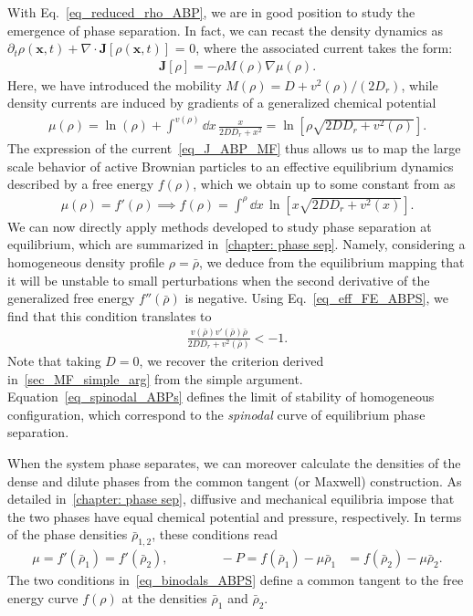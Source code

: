 With Eq.~\eqref{eq_reduced_rho_ABP}, we are in good position to study the emergence of phase separation.
In fact, we can recast the density dynamics as $\partial_t \rho(\bm x, t)  + \nabla \cdot \bm J[\rho(\bm x, t)]$ = 0,
where the associated current takes the form:
% 
\begin{align}\label{eq_J_ABP_MF}
   \bm J[\rho] = - \rho M(\rho) \nabla \mu(\rho).
\end{align}
%
Here, we have introduced the mobility $M(\rho) = D + v^2(\rho)/ (2D_r)$,
while density currents are induced by gradients of a generalized chemical potential 
\begin{align*}
    \mu(\rho) = \ln(\rho)
    + \int^{v(\rho)} \dd x \, \frac{x}{2 D D_r + x^2} = \ln\left[\rho \sqrt{2 D D_r + v^2(\rho)}\right].
\end{align*}
The expression of the current~\eqref{eq_J_ABP_MF} thus allows us to map the large scale behavior of active Brownian particles to an effective equilibrium dynamics described by a free energy $f(\rho)$, which we obtain up to some constant from as
%
\begin{align} \label{eq_eff_FE_ABPS}
    \mu(\rho) = f'(\rho) \implies
    f(\rho) = \int^\rho \dd x \, \ln \left[ x \sqrt{2 D D_r + v^2(x)}\right].
\end{align}
%
We can now directly apply methods developed to study phase separation at equilibrium, which are summarized in~\autoref{chapter: phase sep}.
Namely, considering a homogeneous density profile $\rho = \bar\rho$, 
we deduce from the equilibrium mapping 
that it will be unstable to small perturbations when the second derivative of the generalized free energy $f''(\bar{\rho})$ is negative.
Using Eq.~\eqref{eq_eff_FE_ABPS}, we find that this condition translates to
%
\begin{align} \label{eq_spinodal_ABPs}
    \frac{v(\bar \rho)v'(\bar \rho)\bar \rho}{2D D_r + v^2(\bar \rho)} < - 1.
\end{align}
%
Note that taking $D = 0$, we recover the criterion derived in~\autoref{sec_MF_simple_arg} from the simple argument.
Equation~\eqref{eq_spinodal_ABPs} defines
the limit of stability of homogeneous configuration, which correspond to the \emph{spinodal} curve of equilibrium phase separation.

When the system phase separates, we can moreover calculate the densities of the dense and dilute phases from the common tangent (or Maxwell) construction.
As detailed in~\autoref{chapter: phase sep}, diffusive and mechanical equilibria impose that the two phases have equal chemical potential and pressure, respectively.
In terms of the phase densities $\bar{\rho}_{1,2}$, these conditions read 
%
\begin{align} \label{eq_binodals_ABPS}
    \mu = f'(\bar \rho_1) = f'(\bar \rho_2), \qquad \qquad
    -P = f(\bar \rho_1) - \mu \bar\rho_1  &= f(\bar \rho_2) - \mu \bar\rho_2.
\end{align}
%
The two conditions in~\eqref{eq_binodals_ABPS} define a common tangent to the free energy curve $f(\rho)$ at the densities $\bar\rho_1$ and $\bar\rho_2$.

